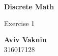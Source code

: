 \documentclass[a4paper, 12pt]{article}
\begin{document}
    \begin{center}
        \vspace*{4.4cm}
            
        \Huge
        \textbf{Discrete Math}
            
        \vspace{0.5cm}
        \LARGE
        Exercise 1

        \vfill
            
        \Large
        \textbf{Aviv Vaknin}\\316017128
                    
    \end{center}
\end{document}
